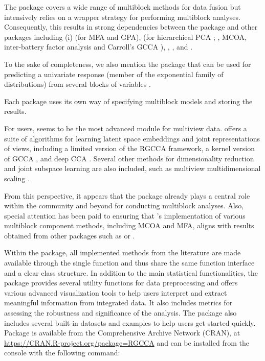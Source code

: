 \documentclass[
]{jss}
\begin{document}
The  package \citep{Liland2022} covers a wide range of
multiblock methods for data fusion but intensively relies on a wrapper
strategy for performing multiblock analyses. Consequently, this results
in strong dependencies between the  package and other
packages including (i)  (for MFA and GPA), 
(for hierarchical PCA \citeauthor{Wold1996} \citeyear{Wold1996};
\citeauthor{Hanafi2010} \citeyear{Hanafi2010}, MCOA, inter-battery
factor analysis \citeauthor{Tucker1958} \citeyear{Tucker1958} and
Carroll's GCCA \citeauthor{Carroll1968a} \citeyear{Carroll1968a}),
\citep[multiblock redundancy analysis][and Statis]{Bougeard2011},
 \citep[for JIVE][]{Lock2013}, and 
\citep[for DISCO][]{Schouteden2014}.

To the sake of completeness, we also mention the 
 package that can be used for predicting a univariate
response (member of the exponential family of distributions) from
several blocks of variables \citep{Ding2022}.

Each package uses its own way of specifying multiblock models and
storing the results.

For  users,  \citep{Perry2021} seems to be
the most advanced  module for multiview data.
 offers a suite of algorithms for learning latent space
embeddings and joint representations of views, including a limited
version of the RGCCA framework, a kernel version of GCCA
\citep{Hardoon2004, Bach2002}, and deep CCA \citep{Andrew2013}. Several
other methods for dimensionality reduction and joint subspace learning
are also included, such as multiview multidimensional scaling
\citep{Trendafilov2010}.

From this perspective, it appears that the  package already
plays a central role within the  community and beyond for
conducting multiblock analyses. Also, special attention has been paid to
ensuring that 's implementation of various multiblock
component methods, including MCOA and MFA, aligns with results obtained
from other packages such as  or .

Within the  package, all implemented methods from the
literature are made available through the single  function
and thus share the same function interface and a clear class structure.
In addition to the main statistical functionalities, the 
package provides several utility functions for data preprocessing and
offers various advanced  \citep{Wickham2016} visualization
tools to help users interpret and extract meaningful information from
integrated data. It also includes metrics for assessing the robustness
and significance of the analysis. The package also includes several
built-in datasets and examples to help users get started quickly.
Package  is available from the Comprehensive 
Archive Network (CRAN), at
\url{https://CRAN.R-project.org/package=RGCCA} and can be installed from
the  console with the following command:
\end{document}
